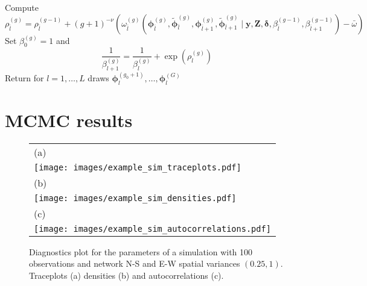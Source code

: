 \documentclass[final]{statsoc}
\begin{document}
\begin{appendix}
\begin{algorithm}[htbp!]
\begin{algorithmic}[1]
\begin{equation*}
                \end{equation*}
                \State Compute 
                \begin{equation*}
                    \rho_{\bar{l}}^{(g)} =  \rho_{\bar{l}}^{(g-1)} + (g+1)^{-\nu}\left(\omega_{\bar{l}}^{(g)}\left(\bm{\phi}_{\bar{l}}^{(g)},\widetilde{\bm{\phi}}_{\bar{l}}^{(g)},\bm{\phi}_{\bar{l} + 1}^{(g)},\widetilde{\bm{\phi}}_{\bar{l} + 1}^{(g)}\mid \mathbf{y}, \mathbf{Z}, \bm{\delta},\beta_{\bar{l}}^{(g-1)},\beta_{\bar{l} + 1}^{(g-1)} \right) - \bar{\omega}\right)
                \end{equation*}
                \State Set $\beta_{0}^{(g)} = 1$ and
                \begin{equation*}
                    \frac{1}{\beta_{l+1}^{(g)}} = \frac{1}{\beta_{l}^{(g)}} + \exp{\left( \rho_{l}^{(g)} \right)}
                \end{equation*}
                \EndFor
            \EndFor
            \State Return for $l = 1,\dots,L$ draws $\bm{\phi}_{l}^{(g_{0}+1)},\dots,\bm{\phi}_{l}^{(G)}$
        \end{algorithmic}
    \end{algorithm}
    
\section{MCMC results}\label{sec:app_images}
    
    \begin{figure}[htbp!]
        \centering
        \begin{tabular}{l}
            (a) \\
            \texttt{[image: images/example\_sim\_traceplots.pdf]} \\
            (b) \\
            \texttt{[image: images/example\_sim\_densities.pdf]} \\
            (c) \\
            \texttt{[image: images/example\_sim\_autocorrelations.pdf]}
        \end{tabular}
        \caption{Diagnostics plot for the parameters of a simulation with 100 observations and network N-S and E-W spatial variances $(0.25,1)$. Traceplots (a) densities (b) and autocorrelations (c).}
        \label{fig:sim_diagn}
    \end{figure}


\end{appendix}
\end{document}
